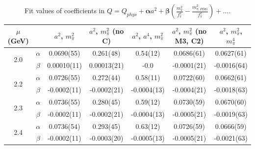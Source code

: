 \documentclass[12pt]{extarticle}
\begin{document}
\begin{table}[h!]
\begin{center}
\begin{tabular}{|c c|c|c|c|c|c|}
\hline
$\mu$ (GeV) &  & $a^2$, $m_\pi^2$& $a^2$, $m_\pi^2$ (no C)& $a^2$, $a^4$, $m_\pi^2$& $a^2$, $m_\pi^2$ (no M3, C2)& $a^2$, $m_\pi^2$, $m_\pi^4$\\
\hline
\multirow{2}{0.5in}{2.0} & $\alpha$ & 0.0690(55)& 0.261(48)& 0.54(12)& 0.0686(61)& 0.0627(61)\\
 & $\beta$ & 0.00010(11)& 0.00013(21)& -0.0& -0.0001(21)& -0.0016(64)\\
\hline
\multirow{2}{0.5in}{2.2} & $\alpha$ & 0.0726(55)& 0.272(44)& 0.58(11)& 0.0722(60)& 0.0662(61)\\
 & $\beta$ & -0.0002(11)& -0.0002(21)& -0.0004(13)& -0.0004(21)& -0.0018(63)\\
\hline
\multirow{2}{0.5in}{2.3} & $\alpha$ & 0.0736(55)& 0.280(45)& 0.59(12)& 0.0730(59)& 0.0670(60)\\
 & $\beta$ & -0.0002(11)& -0.0002(21)& -0.0004(13)& -0.0005(21)& -0.0019(63)\\
\hline
\multirow{2}{0.5in}{2.4} & $\alpha$ & 0.0736(54)& 0.293(45)& 0.63(12)& 0.0726(59)& 0.0666(59)\\
 & $\beta$ & -0.0002(11)& -0.0003(20)& -0.0005(13)& -0.0005(21)& -0.0021(63)\\
\hline
\end{tabular}
\caption{Fit values of coefficients in $Q = Q_{phys} + \mathbf{\alpha} a^2 + \mathbf{\beta}\left(\frac{m_\pi^2}{f_\pi^2}-\frac{m_{\pi,PDG}^2}{f_\pi^2}\right) + \ldots$.}
\end{center}
\end{table}




















\clearpage
\end{document}
